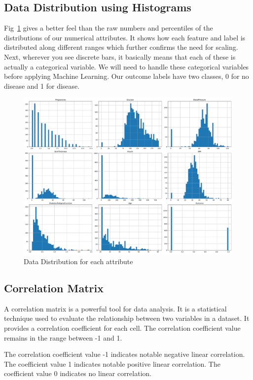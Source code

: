 \subsection{Data Distribution using Histograms}
Fig~\ref{fig:capture_d} gives a better feel than the raw numbers and percentiles of the distributions of our numerical attributes. It shows how each feature and label is distributed along different ranges which further confirms the need for scaling. Next, wherever you see discrete bars, it basically means that each of these is actually a categorical variable. We will need to handle these categorical variables before applying Machine Learning. Our outcome labels have two classes, 0 for no disease and 1 for disease. 
\begin{figure}[ht]
    \centering    \includegraphics[scale=0.3]{figures/data_attr_distribution.pdf}
    \caption{Data Distribution for each attribute}
    \label{fig:capture_d}
\end{figure}

\subsection{Correlation Matrix}
\label{subsec:corr_matrix}
A correlation matrix is a powerful tool for data analysis. It is a statistical technique used to evaluate the relationship between two variables in a dataset. It provides a correlation coefficient for each cell. The correlation coefficient value remains in the range between -1 and 1.

The correlation coefficient value -1 indicates notable negative linear correlation. The coefficient value 1 indicates notable positive linear correlation. The coefficient value 0 indicates no linear correlation.

